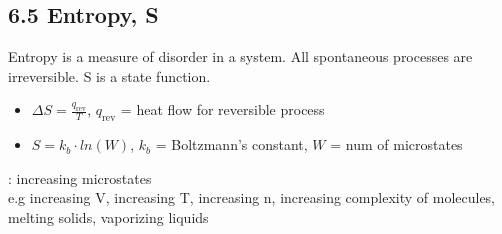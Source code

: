 \subsection{6.5 Entropy, S}
    Entropy is a measure of disorder in a system. All spontaneous processes are irreversible. S is a state function.
    \begin{itemize}
        \item $\Delta S = \frac{q_\text{rev}}{T}$, $q_\text{rev}$ = heat flow for reversible process
        \item $S = k_b \cdot ln(W)$, $k_b$ = Boltzmann's constant, $W$ = num of microstates
    \end{itemize}
    : increasing microstates\\
    e.g increasing V, increasing T, increasing n, increasing complexity of molecules, melting solids, vaporizing liquids